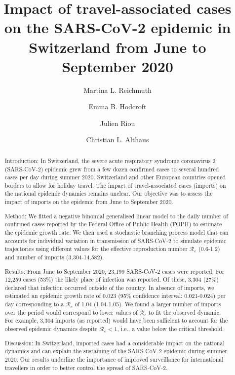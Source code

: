 \documentclass[10pt, a4paper, twoside]{article}
\title{Impact of travel-associated cases on the SARS-CoV-2 epidemic in Switzerland from June to September 2020}
\author[1]{Martina L. Reichmuth}
\author[1]{Emma B. Hodcroft}
\author[1,2]{Julien Riou}
\author[1*]{Christian L. Althaus}
\affil[1]{Institute of Social and Preventive Medicine, University of Bern, Bern, Switzerland}
\affil[2]{Federal Office of Public Health, Liebefeld, Switzerland}
\affil[*]{Correspondence: christian.althaus@ispm.unibe.ch}
\date{}
\begin{document}
\maketitle
\begin{abstract}
\noindent 

Introduction: In Switzerland, the severe acute respiratory syndrome coronavirus 2 (SARS-CoV-2) epidemic grew from a few dozen confirmed cases to several hundred cases per day during summer 2020. 
Switzerland and other European countries opened borders to allow for holiday travel. 
The impact of travel-associated cases (imports) on the national epidemic dynamics remains unclear. 
Our objective was to assess the impact of imports on the epidemic from June to September 2020.

Method: We fitted a negative binomial generalised linear model to the daily number of confirmed cases reported by the Federal Office of Public Health (FOPH) to estimate the epidemic growth rate. 
We then used a stochastic branching process model that can accounts for individual variation in transmission of SARS-CoV-2 to simulate epidemic trajectories using different values for the effective reproduction number $\mathcal{R}_e$ (0.6-1.2) and number of imports (3,304-14,582).

Results: From June to September 2020, 23,199 SARS-CoV-2 cases were reported. 
For 12,259 cases (53\%) the likely place of infection was reported. 
Of these, 3,304 (27\%) declared that infection occurred outside of the country.
In absence of imports, we estimated an epidemic growth rate of 0.023 (95\% confidence interval: 0.021-0.024) per day corresponding to a $\mathcal{R}_e$ of 1.04 (1.04-1.05). 
We found a larger number of imports over the period would correspond to lower values of $\mathcal{R}_e$ to fit the observed dynamic. 
For example, 3,304 imports (as reported) would have been sufficient to account for the observed epidemic dynamics despite $\mathcal{R}_e < 1$, i.e., a value below the critical threshold.

Discussion: 
In Switzerland, imported cases had a considerable impact on the national dynamics and can explain the sustaining of the SARS-CoV-2 epidemic during summer 2020. 
Our results underline the importance of improved surveillance for international travellers in order to better control the spread of SARS-CoV-2.
\clearpage
\end{abstract}
\end{document}
